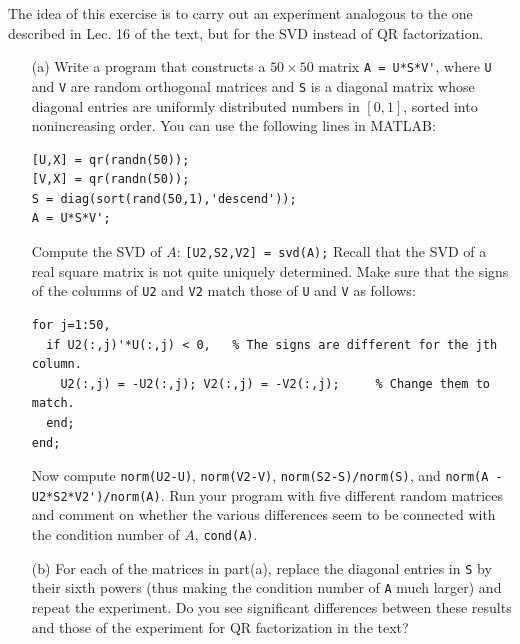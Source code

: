 \documentclass[10pt]{article}
\begin{document}
\begin{problem}[Exercise 2]
The idea of this exercise is to carry out an experiment analogous to the one described
in Lec. 16 of the text, but for the SVD instead of QR factorization.
\begin{enumerate}
    \item[(a)]
Write a program that constructs a \(50 \times 50\) matrix \verb+A = U*S*V'+,
where \verb+U+ and \verb+V+ are random orthogonal matrices and \verb+S+ is a diagonal
matrix whose diagonal entries are uniformly distributed numbers in \([0,1]\), sorted into
nonincreasing order.  You can use the following lines in MATLAB:

\begin{verbatim}
[U,X] = qr(randn(50));
[V,X] = qr(randn(50));
S = diag(sort(rand(50,1),'descend'));
A = U*S*V';
\end{verbatim}

Compute the SVD of \(A\):  \verb+[U2,S2,V2] = svd(A);+  Recall that the SVD of a real square
matrix is not quite uniquely determined.  Make sure that the signs of the columns of \verb+U2+
and \verb+V2+ match those of \verb+U+ and \verb+V+ as follows:

\begin{verbatim}
for j=1:50,
  if U2(:,j)'*U(:,j) < 0,   % The signs are different for the jth column.
    U2(:,j) = -U2(:,j); V2(:,j) = -V2(:,j);     % Change them to match.
  end;
end;
\end{verbatim}

Now compute \verb+norm(U2-U)+, \verb+norm(V2-V)+, \verb+norm(S2-S)/norm(S)+, and
\newline
\verb+norm(A - U2*S2*V2')/norm(A)+.  Run your program with five different random matrices
and comment on whether the various differences seem to be connected with the
condition number of \(A\), \verb+cond(A)+.

\item[(b)]
For each of the matrices in part(a), replace the diagonal entries in \verb+S+ by
their sixth powers (thus making the condition number of \verb+A+ much larger) and
repeat the experiment.  Do you see significant differences between these results and
those of the experiment for QR factorization in the text?
\end{enumerate}
\end{problem}
\end{document}
